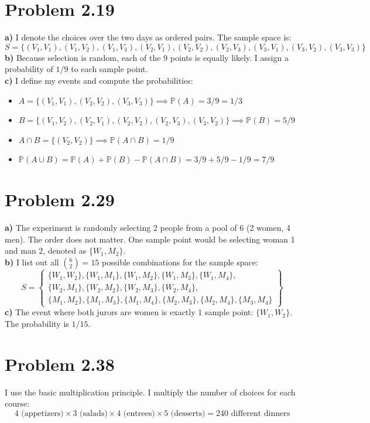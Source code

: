 \documentclass[11pt, letterpaper]{article}
\newcommand{\Prob}{\mathbb{P}}
\begin{document}
\section*{Problem 2.19}
\textbf{a)} I denote the choices over the two days as ordered pairs. The sample space is:
\[ S = \{(V_1,V_1), (V_1,V_2), (V_1,V_3), (V_2,V_1), (V_2,V_2), (V_2,V_3), (V_3,V_1), (V_3,V_2), (V_3,V_3)\} \]
\textbf{b)} Because selection is random, each of the 9 points is equally likely. I assign a probability of $1/9$ to each sample point. \\
\textbf{c)} I define my events and compute the probabilities:
\begin{itemize}
    \item $A = \{(V_1,V_1), (V_2,V_2), (V_3,V_3)\} \implies \Prob(A) = 3/9 = 1/3$
    \item $B = \{(V_1,V_2), (V_2,V_1), (V_2,V_2), (V_2,V_3), (V_3,V_2)\} \implies \Prob(B) = 5/9$
    \item $A \cap B = \{(V_2,V_2)\} \implies \Prob(A \cap B) = 1/9$
    \item $\Prob(A \cup B) = \Prob(A) + \Prob(B) - \Prob(A \cap B) = 3/9 + 5/9 - 1/9 = 7/9$
\end{itemize}

\section*{Problem 2.29}
\textbf{a)} The experiment is randomly selecting 2 people from a pool of 6 (2 women, 4 men). The order does not matter. One sample point would be selecting woman 1 and man 2, denoted as $\{W_1, M_2\}$. \\
\textbf{b)} I list out all $\binom{6}{2} = 15$ possible combinations for the sample space:
\[ S = \left\{ \begin{array}{l} \{W_1,W_2\}, \{W_1,M_1\}, \{W_1,M_2\}, \{W_1,M_3\}, \{W_1,M_4\}, \\ \{W_2,M_1\}, \{W_2,M_2\}, \{W_2,M_3\}, \{W_2,M_4\}, \\ \{M_1,M_2\}, \{M_1,M_3\}, \{M_1,M_4\}, \{M_2,M_3\}, \{M_2,M_4\}, \{M_3,M_4\} \end{array} \right\} \]
\textbf{c)} The event where both jurors are women is exactly 1 sample point: $\{W_1, W_2\}$. The probability is $1/15$.

\section*{Problem 2.38}
I use the basic multiplication principle. I multiply the number of choices for each course:
\[ 4 \text{ (appetizers)} \times 3 \text{ (salads)} \times 4 \text{ (entrees)} \times 5 \text{ (desserts)} = 240 \text{ different dinners} \]
\end{document}
